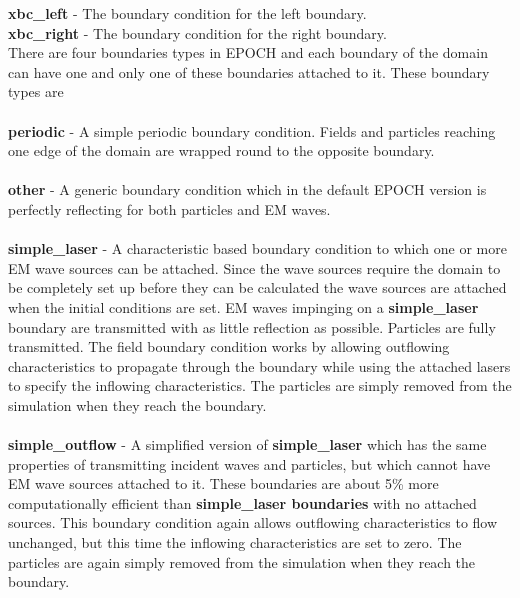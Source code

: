 \documentclass[12pt]{article}
\newcommand{\emphtext}{\color{warwickdark} \fontfamily{phv}\selectfont\Large\bf}
\newcommand{\inlineemph}{\color{warwicklight} \bf}
\newcommand{\EPOCH}{{\color{warwickdark}\fontfamily{phv}\selectfont EPOCH} }
\begin{document}
{\emphtext xbc\_left} - The boundary condition for the left boundary.\\

{\emphtext xbc\_right} - The boundary condition for the right boundary.\\

There are four boundaries types in \EPOCH and each boundary of the domain can
have one and only one of these boundaries attached to it. These boundary types
are\\\\

{\emphtext periodic} - A simple periodic boundary condition. Fields and
particles reaching one edge of the domain are wrapped round to the opposite
boundary.\\\\

{\emphtext other} - A generic boundary condition which in the default \EPOCH
version is perfectly reflecting for both particles and EM waves.\\\\

{\emphtext simple\_laser} - A characteristic based boundary condition to which
one or more EM wave sources can be attached. Since the wave sources require the
domain to be completely set up before they can be calculated the wave sources
are attached when the initial conditions are set.  EM waves impinging on a
{\inlineemph simple\_laser} boundary are transmitted with as little reflection
as possible. Particles are fully transmitted. The field boundary condition
works by allowing outflowing characteristics to propagate through the boundary
while using the attached lasers to specify the inflowing characteristics. The
particles are simply removed from the simulation when they reach the
boundary.\\\\

{\emphtext simple\_outflow} - A simplified version of {\inlineemph
simple\_laser} which has the same properties of transmitting incident waves and
particles, but which cannot have EM wave sources attached to it. These
boundaries are about 5\% more computationally efficient than {\inlineemph
simple\_laser boundaries} with no attached sources. This boundary condition
again allows outflowing characteristics to flow unchanged, but this time the
inflowing characteristics are set to zero. The particles are again simply
removed from the simulation when they reach the boundary.\\\\
\end{document}
